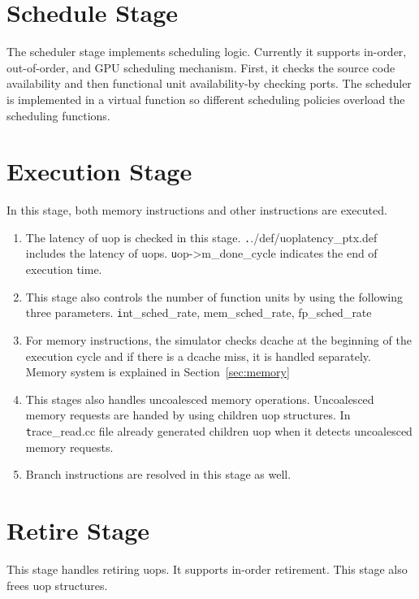 \section{Schedule Stage}
The scheduler stage implements scheduling logic. Currently it supports in-order, out-of-order, and GPU scheduling mechanism. 
First, it checks the source code availability and then functional unit availability-by checking ports. 
 The scheduler is implemented in a virtual function so different scheduling policies overload the scheduling functions. 

\section{Execution Stage}

In this stage, both memory instructions and other instructions are executed. 
\begin{enumerate} 

\item The latency of uop is checked in this stage. 
{\texttt ../def/uoplatency\_ptx.def} includes the latency of uops. 
{\texttt uop->m\_done\_cycle} indicates the end of execution time. 

\item This stage also controls the number of function units by using the following three parameters. 
{\texttt int\_sched\_rate, mem\_sched\_rate, fp\_sched\_rate}

\item For memory instructions, the simulator checks dcache at the beginning of the execution cycle 
and if there is a dcache miss, it is handled separately. Memory system is explained in Section~\ref{sec:memory}

\item This stages also handles uncoalesced memory operations. Uncoalesced memory requests are handed 
by using children uop structures. In {\texttt trace\_read.cc} file already generated children uop when it detects uncoalesced memory requests. 

\item Branch instructions are resolved in this stage as well. 
\end{enumerate} 

\section{Retire Stage}
This stage handles retiring uops. It supports in-order retirement. 
This stage also frees uop structures. 

